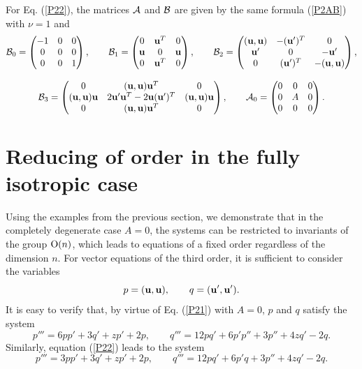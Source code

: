 \documentclass[11pt]{article}
\theoremstyle{plain}
\theoremstyle{definition}
\begin{document}
For Eq. (\ref{P22}), the matrices ${\cal A}$ and ${\cal B}$ are given by the same formula (\ref{P2AB}) with $\nu=1$ and
\begin{equation}\label{P22AB}
\begin{gathered}
 {\cal B}_0=\begin{pmatrix} -1 & 0 & 0\\ 0 & 0 & 0\\ 0 & 0 & 1 \end{pmatrix},\qquad
 {\cal B}_1=\begin{pmatrix} 0 & {\bf u}^T & 0\\ {\bf u} & 0 & {\bf u}\\ 0 & {\bf u}^T & 0 \end{pmatrix},\qquad
 {\cal B}_2=\begin{pmatrix} 
  ({\bf u},{\bf u}) & -({\bf u}')^T & 0\\
  {\bf u}' & 0 & -{\bf u}'\\ 
  0 & ({\bf u}')^T & -({\bf u},{\bf u})\end{pmatrix},\\[3mm]
 {\cal B}_3=\begin{pmatrix} 
  0 & ({\bf u},{\bf u}){\bf u}^T & 0\\ 
  ({\bf u},{\bf u}){\bf u} & 2{\bf u}'{\bf u}^T-2{\bf u}({\bf u}')^T & ({\bf u},{\bf u}){\bf u}\\
  0 & ({\bf u},{\bf u}){\bf u}^T & 0 
  \end{pmatrix},\qquad
 {\cal A}_0=\begin{pmatrix} 0&0&0\\ 0&A&0\\ 0&0&0 \end{pmatrix}.
\end{gathered}
\end{equation}

\section{Reducing of order in the fully isotropic case}\label{s:A0}

Using the examples from the previous section, we demonstrate that in the completely degenerate case $A=0$, the systems can be restricted to invariants of the group ${\rm O}(n)$, which leads to equations of a fixed order regardless of the dimension $n$. For vector equations of the third order, it is sufficient to consider the variables
\[
 p=({\bf u},{\bf u}),\qquad q=({\bf u}',{\bf u}').
\]
It is easy to verify that, by virtue of Eq. (\ref{P21}) with $A=0$, $p$ and $q$ satisfy the system
\begin{equation}\label{P21-pq}
 p'''= 6pp'+3q'+zp'+2p,\qquad
 q'''= 12pq'+6p'p''+3p''+4zq'-2q.
\end{equation}
Similarly, equation (\ref{P22}) leads to the system
\begin{equation}\label{P22-pq}
 p'''= 3pp'+3q'+zp'+2p,\qquad
 q'''= 12pq'+6p'q+3p''+4zq'-2q.
\end{equation}
\end{document}
